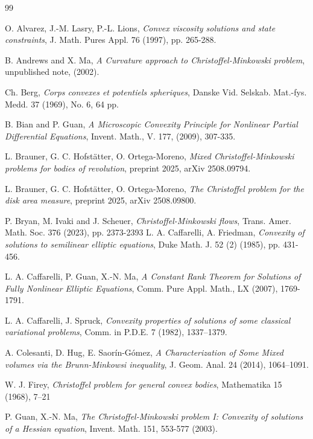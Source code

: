 \documentclass[12pt]{amsart}
\newcommand{\1}{\mathbf 1}
\begin{document}
\begin{thebibliography}{99}

 O. Alvarez, J.-M. Lasry, P.-L. Lions, {\it Convex viscosity solutions and state constraints}, J. Math. Pures Appl. 76 (1997), pp. 265-288.

 B. Andrews and X. Ma, {\em A Curvature approach to Christoffel-Minkowski problem}, unpublished note, (2002).

 Ch. Berg, {\em Corps convexes et potentiels spheriques}, Danske Vid. Selskab. Mat.-fys. Medd. 37 (1969), No. 6, 64 pp.

 B. Bian and P. Guan, {\it A Microscopic Convexity Principle for Nonlinear Partial Differential Equations},
Invent. Math., V. 177, (2009), 307-335.

 L. Brauner, G. C. Hofst\"atter, O. Ortega-Moreno, {\it Mixed Christoffel-Minkowski problems for bodies of revolution}, preprint 2025, arXiv 2508.09794.

 L. Brauner, G. C. Hofst\"atter, O. Ortega-Moreno, {\it The Christoffel problem for the disk area measure}, preprint 2025, arXiv 2508.09800.

 P. Bryan, M. Ivaki and J. Scheuer, {\em Christoffel-Minkowski flows}, Trans. Amer. Math. Soc. 376 (2023), pp. 2373-2393
 L. A. Caffarelli, A. Friedman, {\it Convexity of solutions to semilinear elliptic equations}, Duke Math. J. 52 (2) (1985), pp. 431-456.

 L. A. Caffarelli, P. Guan, X.-N. Ma, {\it A Constant Rank Theorem for Solutions of Fully Nonlinear Elliptic Equations}, Comm. Pure Appl. Math., LX (2007), 1769-1791.

 L. A. Caffarelli, J. Spruck, {\it Convexity properties of solutions of some classical variational problems}, Comm. in P.D.E. 7 (1982), 1337--1379.

 A. Colesanti, D. Hug, E. Saor\'in-G\'omez, {\it A Characterization of Some Mixed volumes via the Brunn-Minkowsi inequality}, J. Geom. Anal. 24 (2014), 1064--1091.

 W. J. Firey, {\it Christoffel problem for general convex bodies}, Mathematika 15 (1968), 7--21

 P. Guan, X.-N. Ma, {\it The Christoffel-Minkowski problem I: Convexity of solutions of a Hessian equation}, Invent. Math. 151, 553-577 (2003).


\end{thebibliography}
\end{document}
